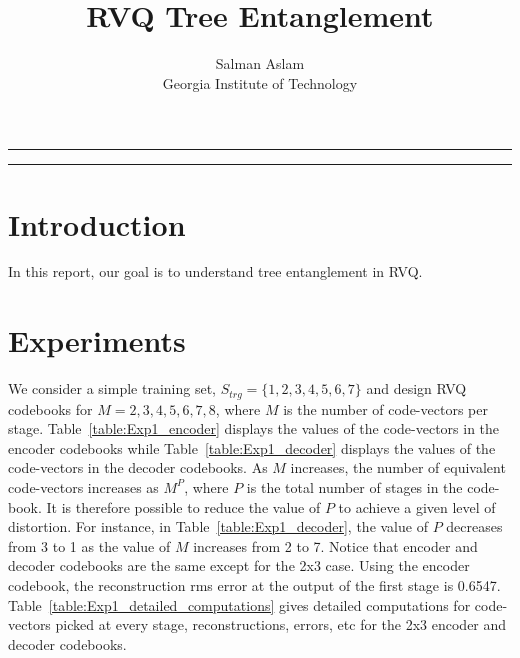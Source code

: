 
\title{RVQ Tree Entanglement}
\author{Salman Aslam\\ Georgia Institute of Technology}
\date{}


\maketitle
\rule[0pt]{\textwidth}{1pt}
\tableofcontents
\rule[0pt]{\textwidth}{1pt}


\section{Introduction}
In this report, our goal is to understand tree entanglement in RVQ.

\section{Experiments}
We consider a simple training set, $S_{trg}=\{1,2,3,4,5,6,7\}$ and design RVQ codebooks for $M=2,3,4,5,6,7,8$, where $M$ is the number of code-vectors per stage.  Table~\ref{table:Exp1_encoder} displays the values of the code-vectors in the encoder codebooks while Table~\ref{table:Exp1_decoder} displays the values of the code-vectors in the decoder codebooks.  As $M$ increases, the number of equivalent code-vectors increases as $M^P$, where $P$ is the total number of stages in the code-book.  It is therefore possible to reduce the value of $P$ to achieve a given level of distortion.  For instance, in Table~\ref{table:Exp1_decoder}, the value of $P$ decreases from 3 to 1 as the value of $M$ increases from 2 to 7.  Notice that encoder and decoder codebooks are the same except for the 2x3 case.  Using the encoder codebook, the reconstruction rms error at the output of the first stage is 0.6547.  Table~\ref{table:Exp1_detailed_computations} gives detailed computations for code-vectors picked at every stage, reconstructions, errors, etc for the 2x3 encoder and decoder codebooks. 


